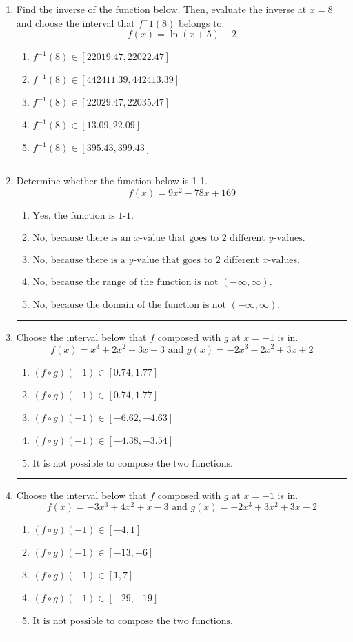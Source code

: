 \documentclass[14pt]{extbook}
\newcommand{\litem}[1]{\item#1\hspace*{-1cm}\rule{\textwidth}{0.4pt}}
\begin{document}
\begin{enumerate}
{\begin{enumerate}[label=\Alph*.]
\end{enumerate} }
\litem{
Find the inverse of the function below. Then, evaluate the inverse at $x = 8$ and choose the interval that $f^-1(8)$ belongs to.\[ f(x) = \ln{(x+5)}-2 \]\begin{enumerate}[label=\Alph*.]
\item \( f^{-1}(8) \in [22019.47, 22022.47] \)
\item \( f^{-1}(8) \in [442411.39, 442413.39] \)
\item \( f^{-1}(8) \in [22029.47, 22035.47] \)
\item \( f^{-1}(8) \in [13.09, 22.09] \)
\item \( f^{-1}(8) \in [395.43, 399.43] \)

\end{enumerate} }
\litem{
Determine whether the function below is 1-1.\[ f(x) = 9 x^2 - 78 x + 169 \]\begin{enumerate}[label=\Alph*.]
\item \( \text{Yes, the function is 1-1.} \)
\item \( \text{No, because there is an $x$-value that goes to 2 different $y$-values.} \)
\item \( \text{No, because there is a $y$-value that goes to 2 different $x$-values.} \)
\item \( \text{No, because the range of the function is not $(-\infty, \infty)$.} \)
\item \( \text{No, because the domain of the function is not $(-\infty, \infty)$.} \)

\end{enumerate} }
\litem{
Choose the interval below that $f$ composed with $g$ at $x=-1$ is in.\[ f(x) = x^{3} +2 x^{2} -3 x -3 \text{ and } g(x) = -2x^{3} -2 x^{2} +3 x + 2 \]\begin{enumerate}[label=\Alph*.]
\item \( (f \circ g)(-1) \in [0.74, 1.77] \)
\item \( (f \circ g)(-1) \in [0.74, 1.77] \)
\item \( (f \circ g)(-1) \in [-6.62, -4.63] \)
\item \( (f \circ g)(-1) \in [-4.38, -3.54] \)
\item \( \text{It is not possible to compose the two functions.} \)

\end{enumerate} }
\litem{
Choose the interval below that $f$ composed with $g$ at $x=-1$ is in.\[ f(x) = -3x^{3} +4 x^{2} +x -3 \text{ and } g(x) = -2x^{3} +3 x^{2} +3 x -2 \]\begin{enumerate}[label=\Alph*.]
\item \( (f \circ g)(-1) \in [-4, 1] \)
\item \( (f \circ g)(-1) \in [-13, -6] \)
\item \( (f \circ g)(-1) \in [1, 7] \)
\item \( (f \circ g)(-1) \in [-29, -19] \)
\item \( \text{It is not possible to compose the two functions.} \)


\end{enumerate}}
\end{enumerate}
\end{document}
